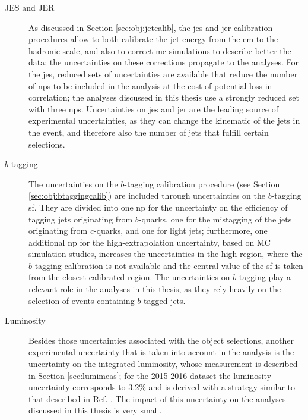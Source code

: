 \begin{description}

\item[JES and JER] As discussed in Section \ref{sec:obj:jetcalib}, the \gls{jes} and \gls{jer} calibration procedures allow to both calibrate the jet energy from the \gls{em} to the
hadronic scale, and also to correct \gls{mc} simulations to describe better the data; the uncertainties on these corrections propagate to the analyses. 
For the \gls{jes}, reduced sets of uncertainties are available that reduce the number of \glspl{np} to be included in the analysis at the cost of potential loss in correlation; 
the analyses discussed in this thesis use a strongly reduced set with three \glspl{np}. 
Uncertainties on \gls{jes} and \gls{jer} are the leading source of experimental uncertainties, as they can change the kinematic of the jets in the event, and therefore also the number
of jets that fulfill certain selections.

\item[$b$-tagging] The uncertainties on the $b$-tagging calibration procedure (see Section \ref{sec:obj:btaggingcalib}) are included through uncertainties on the $b$-tagging \gls{sf}. 
They are divided into one \gls{np} for the uncertainty on the efficiency of tagging jets originating from $b$-quarks, 
one for the mistagging of the jets originating from 
$c$-quarks, and one for light jets; 
furthermore, one additional \gls{np} for the high-\pt extrapolation uncertainty, based on MC simulation studies, 
increases the uncertainties in the high-\pt region, where the $b$-tagging calibration is not available and the central 
value of the \gls{sf} is taken from the closest calibrated \pt region. 
The uncertainties on $b$-tagging play a relevant role in the analyses in this thesis, as they rely heavily on the selection of events containing $b$-tagged jets.

\item[Luminosity] Besides those uncertainties associated with the object selections, 
another experimental uncertainty that is taken into account in the analysis is 
the uncertainty on the integrated luminosity, whose measurement is described in Section \ref{sec:lumimeas}; for the 2015-2016 dataset the luminosity uncertainty corresponds 
to 3.2\% and is derived with a strategy similar to that described in Ref. \cite{Aaboud:2016hhf}. The impact of this uncertainty on the analyses discussed in this thesis is very small.

\end{description}

